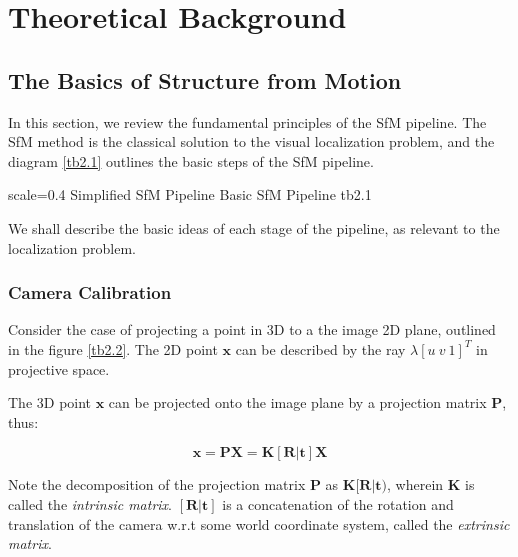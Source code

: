 

\chapter{Theoretical Background}

\section{The Basics of Structure from Motion}
In this section, we review the fundamental principles of the SfM pipeline. The SfM method is the classical solution to the visual localization problem, and the diagram \ref{tb2.1} outlines the basic steps of the SfM pipeline.

       {scale=0.4}%
       {Simplified SfM Pipeline}%
       {Basic SfM Pipeline}%
       {tb2.1}

We shall describe the basic ideas of each stage of the pipeline, as relevant to the localization problem. 

\subsection{Camera Calibration}
Consider the case of projecting a point in 3D to a the image 2D plane, outlined in the figure \ref{tb2.2}. The 2D point $\mathbf{x}$ can be described by the ray $\lambda[u\ v\ 1]^T$ in projective space.

The 3D point $\mathbf{x}$ can be projected onto the image plane by a projection matrix $\mathbf{P}$, thus:

\[\mathbf{x} = \mathbf{PX} = \mathbf{K[R|t]X}\]

Note the decomposition of the projection matrix $\mathbf{P}$ as $\mathbf{K[R|t})$, wherein \textbf{K} is called the \emph{ intrinsic matrix}. $\mathbf{[R|t]}$ is a concatenation of the rotation and translation of the camera w.r.t some world coordinate system, called the \emph{extrinsic matrix}.

